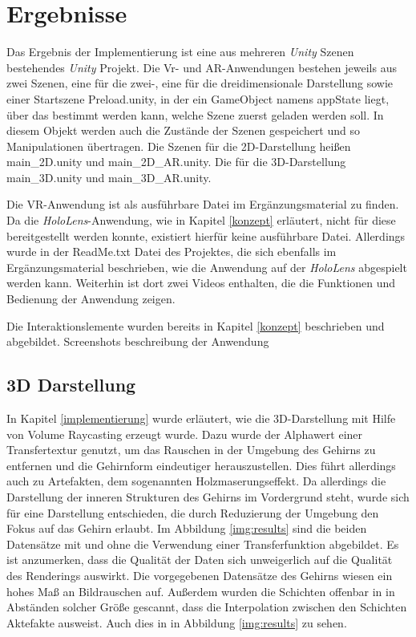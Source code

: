 

\section{Ergebnisse}
\label{ergebnisse}

Das Ergebnis der Implementierung ist eine aus mehreren \textit{Unity} Szenen bestehendes \textit{Unity} Projekt.
Die Vr- und AR-Anwendungen bestehen jeweils aus zwei Szenen, eine für die zwei-, eine für die dreidimensionale Darstellung sowie einer Startszene Preload.unity, in der ein GameObject namens appState liegt, über das bestimmt werden kann, welche Szene zuerst geladen werden soll. In diesem Objekt werden auch die Zustände der Szenen gespeichert und so Manipulationen übertragen.
Die Szenen für die 2D-Darstellung heißen main\_2D.unity und main\_2D\_AR.unity. Die für die 3D-Darstellung main\_3D.unity und main\_3D\_AR.unity.

Die VR-Anwendung ist als ausführbare Datei im Ergänzungsmaterial zu finden. Da die \textit{HoloLens}-Anwendung, wie in Kapitel \ref{konzept} erläutert, nicht für diese bereitgestellt werden konnte, existiert hierfür keine ausführbare Datei. Allerdings wurde in der ReadMe.txt Datei des Projektes, die sich ebenfalls im Ergänzungsmaterial beschrieben, wie die Anwendung auf der \textit{HoloLens} abgespielt werden kann. 
Weiterhin ist dort zwei Videos enthalten, die die Funktionen und Bedienung der Anwendung zeigen.

Die Interaktionslemente wurden bereits in Kapitel \ref{konzept} beschrieben und abgebildet. 
Screenshots
beschreibung der Anwendung

\subsection{3D Darstellung}

In Kapitel \ref{implementierung} wurde erläutert, wie die 3D-Darstellung mit Hilfe von Volume Raycasting erzeugt wurde. 
Dazu wurde der Alphawert einer Transfertextur genutzt, um das Rauschen in der Umgebung des Gehirns zu entfernen und die Gehirnform eindeutiger herauszustellen. Dies führt allerdings auch zu Artefakten, dem sogenannten Holzmaserungseffekt. Da allerdings die Darstellung der inneren Strukturen des Gehirns im Vordergrund steht, wurde sich für eine Darstellung entschieden, die durch Reduzierung der Umgebung den Fokus auf das Gehirn erlaubt. 
Im Abbildung \ref{img:results} sind die beiden Datensätze mit und ohne die Verwendung einer Transferfunktion abgebildet. 
Es ist anzumerken, dass die Qualität der Daten sich unweigerlich auf die Qualität des Renderings auswirkt. Die vorgegebenen Datensätze des Gehirns wiesen ein hohes Maß an Bildrauschen auf. Außerdem wurden die Schichten offenbar in in Abständen solcher Größe gescannt, dass die Interpolation zwischen den Schichten Aktefakte ausweist. Auch dies in in Abbildung \ref{img:results} zu sehen.

